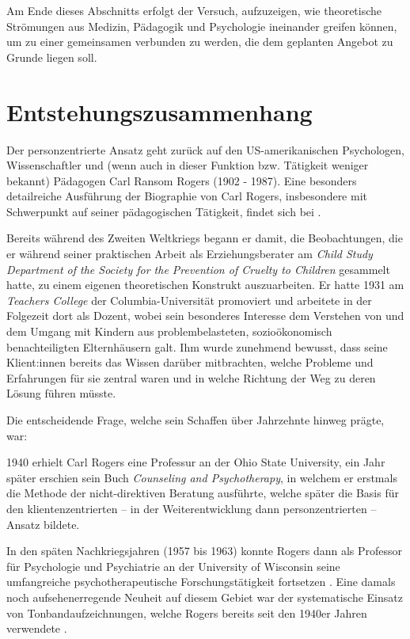 \documentclass[
  twoside,
  parskip=half-,
]{scrreprt}
\begin{document}
Am Ende dieses Abschnitts erfolgt der Versuch, aufzuzeigen, wie theoretische Strömungen aus Medizin, Pädagogik und Psychologie ineinander greifen können, um zu einer gemeinsamen  verbunden zu werden, die dem geplanten Angebot zu Grunde liegen soll.

\section{Entstehungszusammenhang}

Der personzentrierte Ansatz geht zurück auf den US-amerikanischen Psychologen, Wissenschaftler und (wenn auch in dieser Funktion bzw. Tätigkeit weniger bekannt) Pädagogen Carl Ransom Rogers (1902 - 1987). Eine besonders detailreiche Ausführung der Biographie von Carl Rogers, insbesondere mit Schwerpunkt auf seiner pädagogischen Tätigkeit, findet sich bei \textcite[vgl.][Kap. 3]{kunze}. 

Bereits während des Zweiten Weltkriegs begann er damit, die Beobachtungen, die er während seiner praktischen Arbeit als Erziehungsberater am \textit{Child Study Department of the Society for the Prevention of Cruelty to Children} gesammelt hatte, zu einem eigenen theoretischen Konstrukt auszuarbeiten. Er hatte 1931 am \textit{Teachers College} der Columbia-Universität promoviert und arbeitete in der Folgezeit dort als Dozent, wobei sein besonderes Interesse dem Verstehen von und dem Umgang mit Kindern aus problembelasteten, sozioökonomisch benachteiligten Elternhäusern galt. Ihm wurde zunehmend bewusst, dass seine Klient:innen bereits das Wissen darüber mitbrachten, welche Probleme und Erfahrungen für sie zentral waren und in welche Richtung der Weg zu deren Lösung führen müsste. 

Die entscheidende Frage, welche sein Schaffen über Jahrzehnte hinweg prägte, war: 

1940 erhielt Carl Rogers eine Professur an der Ohio State University, ein Jahr später erschien sein Buch \textit{Counseling and Psychotherapy}, in welchem er erstmals die Methode der nicht-direktiven Beratung ausführte, welche später die Basis für den klientenzentrierten -- in der Weiterentwicklung dann personzentrierten -- Ansatz bildete.

In den späten Nachkriegsjahren (1957 bis 1963) konnte Rogers dann als Professor für Psychologie und Psychiatrie an der University of Wisconsin seine umfangreiche psychotherapeutische Forschungstätigkeit fortsetzen \autocite[vgl.][Kap. 5.2.1]{kunze}. Eine damals noch aufsehenerregende Neuheit auf diesem Gebiet war der systematische Einsatz von Tonbandaufzeichnungen, welche Rogers bereits seit den 1940er Jahren verwendete \autocite[239]{kunze}.
\end{document}
